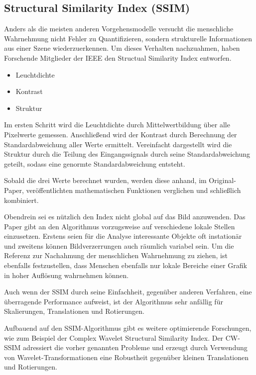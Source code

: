 \subsection{Structural Similarity Index (SSIM)}
Anders als die meisten anderen Vorgehensmodelle versucht die menschliche
Wahrnehmung nicht Fehler zu Quantifizieren, sondern strukturelle Informationen
aus einer Szene wiederzuerkennen. Um dieses Verhalten nachzuahmen, haben
Forschende Mitglieder der IEEE den Structual Similarity Index entworfen.

\begin{itemize}[topsep=0pt]
    \item Leuchtdichte
    \item Kontrast
    \item Struktur
\end{itemize}

Im ersten Schritt wird die Leuchtdichte durch Mittelwertbildung über alle
Pixelwerte gemessen. Anschließend wird der Kontrast durch Berechnung der
Standardabweichung aller Werte ermittelt. Vereinfacht dargestellt wird die
Struktur durch die Teilung des Eingangssignals durch seine Standardabweichung
geteilt, sodass eine genormte Standardabweichung entsteht.

Sobald die drei Werte berechnet wurden, werden diese anhand, im Original-Paper,
veröffentlichten mathematischen Funktionen verglichen und schließlich
kombiniert.

Obendrein sei es nützlich den Index nicht global auf das Bild anzuwenden. Das
Paper gibt an den Algorithmus vorzugsweise auf verschiedene lokale Stellen
einzusetzen. Erstens seien für die Analyse interessante Objekte oft instationär
und zweitens können Bildverzerrungen auch räumlich variabel sein. Um die
Referenz zur Nachahmung der menschlichen Wahrnehmung zu ziehen, ist ebenfalls
festzustellen, dass Menschen ebenfalls nur lokale Bereiche einer Grafik in hoher
Auflösung wahrnehmen können.

Auch wenn der SSIM durch seine Einfachheit, gegenüber anderen Verfahren, eine
überragende Performance aufweist, ist der Algorithmus sehr anfällig für
Skalierungen, Translationen und Rotierungen.

Aufbauend auf den SSIM-Algorithmus gibt es weitere optimierende Forschungen, wie
zum Beispiel der Complex Wavelet Structural Similarity Index. Der CW-SSIM
adressiert die vorher genannten Probleme und erzeugt durch Verwendung von
Wavelet-Transformationen eine Robustheit gegenüber kleinen Translationen und
Rotierungen. \parencite{ssim-complex-wavelet}